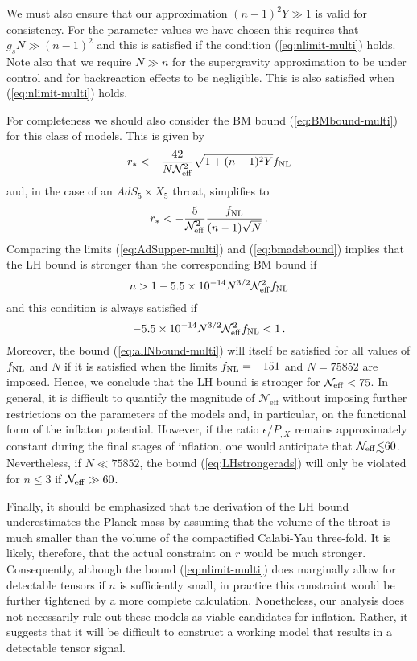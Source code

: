 {We must also ensure that our approximation $(n-1)^2Y \gg 1$ 
is valid for consistency.  
For the parameter values we have chosen this requires that 
$g_s N \gg  (n-1)^2$ 
and this is satisfied if the condition (\ref{eq:nlimit-multi}) 
holds. Note also that we require $N \gg n$ for the supergravity 
approximation to be under control and for backreaction effects to 
be negligible. This is also satisfied when (\ref{eq:nlimit-multi})  
holds. 


For completeness we should also consider the 
BM bound (\ref{eq:BMbound-multi}) for this class of models. This is given by 
% 
\begin{equation}
\label{eq:BMAdS-multi}
r_* < -\frac{42}{N {\cal{N}}^2_{\rm eff}}\sqrt{1 +(n-1)^2Y}f_{\mathrm{NL}} 
\end{equation}
%  
and, in the case of an $AdS_5 \times X_5$ throat, simplifies to
%  
\begin{equation}
\label{eq:bmadsbound}
r_* < -\frac{5}{{\cal{N}}^2_{\rm eff}} 
\frac{f_{\mathrm{NL}}}{(n-1)\sqrt{N}} \,.
\end{equation}
%  
Comparing the limits (\ref{eq:AdSupper-multi}) and (\ref{eq:bmadsbound}) 
implies that the LH bound is stronger than the corresponding BM bound if  
% 
\begin{equation}
\label{eq:LHstrongerads}
n > 1 -5.5 \times 10^{-14} N^{3/2} {\cal{N}}_{\rm eff}^2 f_{\mathrm{NL}} 
\end{equation}
% 
and this condition is always satisfied if 
% 
\begin{equation}
\label{eq:allNbound-multi}
-5.5 \times 10^{-14} N^{3/2} {\cal{N}}_{\rm eff}^2 f_{\mathrm{NL}}  <1  \, .
\end{equation}
% 
Moreover, the bound (\ref{eq:allNbound-multi}) will itself be satisfied for 
all values of $f_{\mathrm{NL}}$ and $N$ if it is satisfied when the limits 
$f_{\mathrm{NL}} =-151$ and $N=75852$ are imposed. Hence, we conclude that the LH bound 
is stronger for ${\cal{N}_{\rm eff}} < 75$. 
In general, it is difficult to quantify 
the magnitude of $\mathcal{N}_{\mathrm{eff}}$ without 
imposing further restrictions on the parameters of the models 
and, in particular, on the functional form of the inflaton potential. 
However, if the ratio $\epsilon/P_{,X}$ remains approximately 
constant during the final stages of inflation, one would anticipate that 
${\cal{N}}_{\rm eff} \lsim 60$. Nevertheless, if $N \ll 75852$, the bound 
(\ref{eq:LHstrongerads}) will only be violated for $n \le 3$ if 
${\cal{N}}_{\rm eff} \gg 60$.  


Finally, it should be emphasized that the derivation of the LH bound 
underestimates the Planck mass by assuming that 
the volume of the throat is much smaller 
than the volume of the compactified Calabi-Yau 
three-fold. It is likely, therefore, 
that the actual constraint on $r$ would be much stronger. Consequently, 
although the bound (\ref{eq:nlimit-multi})  
does marginally allow for detectable tensors if $n$ is sufficiently 
small, in practice this constraint would be further tightened by a more 
complete calculation. Nonetheless, our analysis does not necessarily 
rule out these models as viable candidates for inflation. Rather, it  
suggests that it will be difficult to construct a working model 
that results in a detectable tensor signal.   


}
